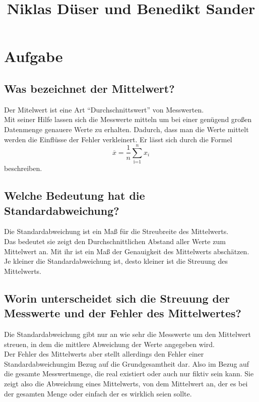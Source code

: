 

\subject{Messunsicherheiten}
\title{Niklas Düser und Benedikt Sander}


\section{Aufgabe }
\subsection{Was bezeichnet der Mittelwert?}
Der Mitelwert ist eine Art \enquote{Durchschnittswert} von Messwerten.\\
Mit seiner Hilfe lassen sich die Messwerte mitteln um bei einer genügend großen Datenmenge genauere Werte zu erhalten.
Dadurch, dass man die Werte mittelt werden die Einflüsse der Fehler verkleinert.
Er lässt sich durch die Formel
\begin{equation*}
    \overline{x}=\frac{1}{n}\sum_{\text{i=1}}^n x_i
\end{equation*}
beschreiben.

\subsection{Welche Bedeutung hat die Standardabweichung?}
Die Standardabweichung ist ein Maß für die Streubreite des Mittelwerts.\\
Das bedeutet sie zeigt den Durchschnittlichen Abstand aller Werte zum Mittelwert an. Mit ihr ist ein Maß der Genauigkeit des Mittelwerts abschätzen.
Je kleiner die Standardabweichung ist, desto kleiner ist die Streuung des Mittelwerts.

\subsection{Worin unterscheidet sich die Streuung der Messwerte und der Fehler des Mittelwertes?}
Die Standardabweichung gibt nur an wie sehr die Messwerte um den Mittelwert streuen, in dem die mittlere Abweichung der Werte angegeben wird.\\
Der Fehler des Mittelwerts aber stellt allerdings den Fehler einer Standardabweichungim Bezug auf die Grundgesamtheit dar. Also im Bezug auf die gesamte Messwertmenge, 
die real existiert oder auch nur fiktiv sein kann. Sie zeigt also die Abweichung eines Mittelwerts, von dem Mittelwert an, der es bei der gesamten Menge oder einfach der es wirklich seien sollte.

